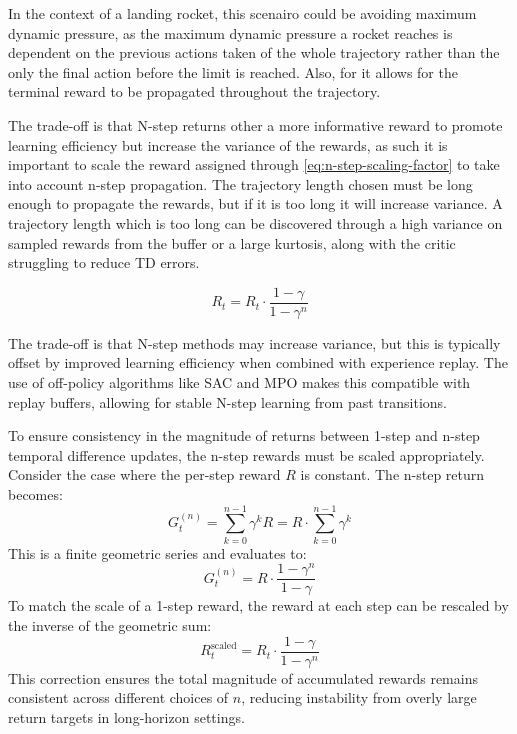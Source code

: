 In the context of a landing rocket, this scenairo could be avoiding maximum dynamic pressure, as the maximum dynamic pressure a rocket reaches is dependent on the previous actions taken of the whole trajectory rather than the only the final action before the limit is reached. Also, for it allows for the terminal reward to be propagated throughout the trajectory.

The trade-off is that N-step returns other a more informative reward to promote learning efficiency but increase the variance of the rewards, as such it is important to scale the reward assigned through \autoref{eq:n-step-scaling-factor} to take into account n-step propagation. The trajectory length chosen must be long enough to propagate the rewards, but if it is too long it will increase variance. A trajectory length which is too long can be discovered through a high variance on sampled rewards from the buffer or a large kurtosis, along with the critic struggling to reduce TD errors.

\begin{equation}
    R_t = R_t \cdot \frac{1-\gamma}{1-\gamma^n}
\label{eq:n-step-scaling-factor}
\end{equation}

The trade-off is that N-step methods may increase variance, but this is typically offset by improved learning efficiency when combined with experience replay. The use of off-policy algorithms like SAC and MPO makes this compatible with replay buffers, allowing for stable N-step learning from past transitions.

\begin{tcolorbox}[title={\textbf{Lemma. N-step reward scaling factor}}]
To ensure consistency in the magnitude of returns between 1-step and n-step temporal difference updates, the n-step rewards must be scaled appropriately. Consider the case where the per-step reward \( R \) is constant. The n-step return becomes:
\[
G_t^{(n)} = \sum_{k=0}^{n-1} \gamma^k R = R \cdot \sum_{k=0}^{n-1} \gamma^k
\]
This is a finite geometric series and evaluates to:
\[
G_t^{(n)} = R \cdot \frac{1 - \gamma^n}{1 - \gamma}
\]
To match the scale of a 1-step reward, the reward at each step can be rescaled by the inverse of the geometric sum:
\[
R_t^{\text{scaled}} = R_t \cdot \frac{1 - \gamma}{1 - \gamma^n}
\]
This correction ensures the total magnitude of accumulated rewards remains consistent across different choices of \( n \), reducing instability from overly large return targets in long-horizon settings.
\end{tcolorbox}

